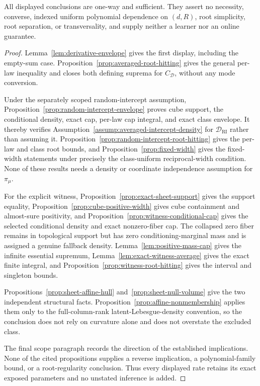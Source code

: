 \begin{proposition}
All displayed conclusions are one-way and sufficient.  They assert no
necessity, converse, indexed uniform polynomial dependence on $(d,R)$,
root simplicity, root separation, or transversality, and supply neither a
learner nor an online guarantee.
\end{proposition}

\begin{proof}
Lemma~\ref{lem:derivative-envelope} gives the first display, including the
empty-sum case.  Proposition~\ref{prop:averaged-root-hitting} gives the
general per-law inequality and closes both defining suprema for
$C_{\mathcal D}$, without any mode conversion.

Under the separately scoped random-intercept assumption,
Proposition~\ref{prop:random-intercept-envelope} proves cube support, the
conditional density, exact cap, per-law cap integral, and exact class
envelope.  It thereby verifies
Assumption~\ref{assump:averaged-intercept-density} for
$\mathcal D_{\mathrm{RI}}$ rather than assuming it.
Proposition~\ref{prop:random-intercept-root-hitting} gives the per-law and
class root bounds, and Proposition~\ref{prop:fixed-width} gives the
fixed-width statements under precisely the class-uniform reciprocal-width
condition.  None of these results needs a density or coordinate
independence assumption for $\pi_\mu$.

For the explicit witness,
Proposition~\ref{prop:exact-sheet-support} gives the support equality,
Proposition~\ref{prop:cube-positive-width} gives cube containment and
almost-sure positivity, and
Proposition~\ref{prop:witness-conditional-cap} gives the selected
conditional density and exact nonzero-fiber cap.  The collapsed zero
fiber remains in topological support but has zero conditioning-marginal
mass and is assigned a genuine fallback density.
Lemma~\ref{lem:positive-mass-cap} gives the infinite essential supremum,
Lemma~\ref{lem:exact-witness-average} gives the exact finite integral, and
Proposition~\ref{prop:witness-root-hitting} gives the interval and
singleton bounds.

Propositions~\ref{prop:sheet-affine-hull}
and~\ref{prop:sheet-null-volume} give the two independent structural
facts.  Proposition~\ref{prop:affine-nonmembership} applies them only to
the full-column-rank latent-Lebesgue-density convention, so the conclusion
does not rely on curvature alone and does not overstate the excluded
class.

The final scope paragraph records the direction of the established
implications.  None of the cited propositions supplies a reverse
implication, a polynomial-family bound, or a root-regularity conclusion.
Thus every displayed rate retains its exact exposed parameters and no
unstated inference is added.
\end{proof}

